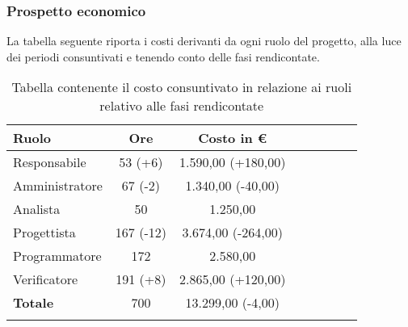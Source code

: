 \subsubsection{Prospetto economico}
La tabella seguente riporta i costi derivanti da ogni ruolo del progetto, alla luce dei periodi consuntivati e tenendo conto delle fasi rendicontate.

\begin{longtable}{|l|c|c|c|c|c|c|c|}
	\hline
	\rowcolor{lighter-grayer}
	\textbf{Ruolo}  & \textbf{Ore} & \textbf{Costo in €} \\
	\hline
	\endfirsthead

	\hline
	Responsabile    & 53 (+6)           & 1.590,00 (+180,00)           \\
	\hline
	\hline
	Amministratore  & 67 (-2)           & 1.340,00 (-40,00)           \\
	\hline
	\hline
	Analista        & 50           & 1.250,00            \\
	\hline
	\hline
	Progettista     & 167 (-12)          & 3.674,00 (-264,00)           \\
	\hline
	\hline
	Programmatore   & 172          & 2.580,00            \\
	\hline
	\hline
	Verificatore    & 191 (+8)         & 2.865,00 (+120,00)           \\
	\hline
	\hline
	\textbf{Totale} & 700          & 13.299,00 (-4,00)           \\
	\hline
	\rowcolor{white}
	\caption{Tabella contenente il costo consuntivato in relazione ai ruoli relativo alle fasi rendicontate}
\end{longtable}

